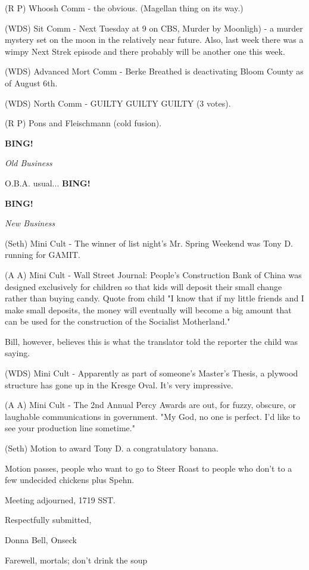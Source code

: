 \documentclass[12pt]{article}
\newcommand{\bing}{{\bf BING!} }
\newcommand{\goto}[1]{\bing \vskip 12pt \centerline{{\em{#1}}}}
\begin{document}
(R P) Whoosh Comm - the obvious. (Magellan thing on its way.)

(WDS) Sit Comm - Next Tuesday at 9 on CBS, Murder by Moonligh) - a murder mystery set on the moon in the relatively near future. Also, last week there was a wimpy Next Strek episode and there probably will be another one this week.

(WDS) Advanced Mort Comm - Berke Breathed is deactivating Bloom County as of August 6th.

(WDS) North Comm - GUILTY GUILTY GUILTY (3 votes).

(R P) Pons and Fleischmann (cold fusion).

\goto{Old Business}

O.B.A. usual... \bing

\goto{New Business}

(Seth) Mini Cult - The winner of list night's Mr. Spring Weekend was Tony D. running for GAMIT.

(A A) Mini Cult - Wall Street Journal: People's Construction Bank of China was designed exclusively for children so that kids will deposit their small change rather than buying candy.  Quote from child "I know that if my little friends and I make small deposits, the money will eventually will become a big amount that can be used for the construction of the Socialist Motherland."

Bill, however, believes this is what the translator told the reporter the child was saying.

(WDS) Mini Cult - Apparently as part of someone's Master's Thesis, a plywood structure has gone up in the Kresge Oval. It's very impressive.

(A A) Mini Cult - The 2nd Annual Percy Awards are out, for fuzzy, obscure, or laughable communications in government. "My God, no one is perfect. I'd like to see your production line sometime."

(Seth) Motion to award Tony D. a congratulatory banana.

Motion passes, people who want to go to Steer Roast to people who don't to a few undecided chickens plus Spehn.

\vspace{12pt}

\noindent
Meeting adjourned, 1719 SST.

\vspace{18pt}

\centerline{Respectfully submitted,}
\centerline{Donna Bell, Onseck}
\centerline{Farewell, mortals; don't drink the soup}
\end{document}
